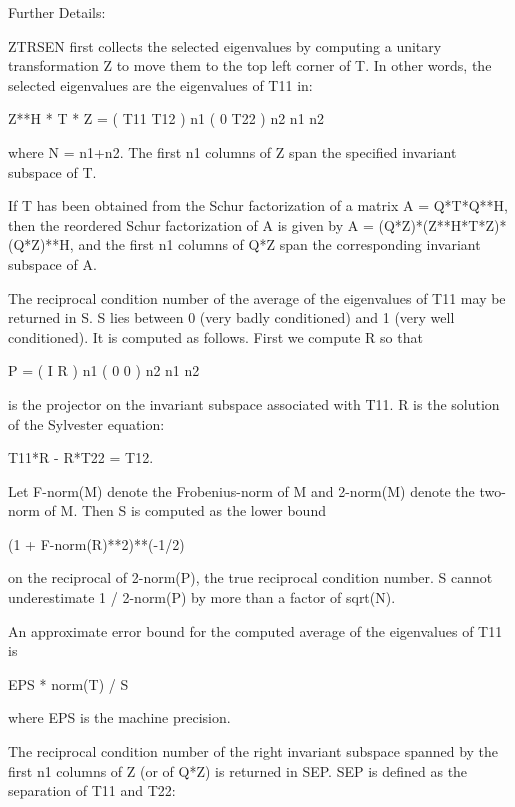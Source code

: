 \begin{DoxyParagraph}{Further Details\+: }
\begin{DoxyVerb}  ZTRSEN first collects the selected eigenvalues by computing a unitary
  transformation Z to move them to the top left corner of T. In other
  words, the selected eigenvalues are the eigenvalues of T11 in:

          Z**H * T * Z = ( T11 T12 ) n1
                         (  0  T22 ) n2
                            n1  n2

  where N = n1+n2. The first
  n1 columns of Z span the specified invariant subspace of T.

  If T has been obtained from the Schur factorization of a matrix
  A = Q*T*Q**H, then the reordered Schur factorization of A is given by
  A = (Q*Z)*(Z**H*T*Z)*(Q*Z)**H, and the first n1 columns of Q*Z span the
  corresponding invariant subspace of A.

  The reciprocal condition number of the average of the eigenvalues of
  T11 may be returned in S. S lies between 0 (very badly conditioned)
  and 1 (very well conditioned). It is computed as follows. First we
  compute R so that

                         P = ( I  R ) n1
                             ( 0  0 ) n2
                               n1 n2

  is the projector on the invariant subspace associated with T11.
  R is the solution of the Sylvester equation:

                        T11*R - R*T22 = T12.

  Let F-norm(M) denote the Frobenius-norm of M and 2-norm(M) denote
  the two-norm of M. Then S is computed as the lower bound

                      (1 + F-norm(R)**2)**(-1/2)

  on the reciprocal of 2-norm(P), the true reciprocal condition number.
  S cannot underestimate 1 / 2-norm(P) by more than a factor of
  sqrt(N).

  An approximate error bound for the computed average of the
  eigenvalues of T11 is

                         EPS * norm(T) / S

  where EPS is the machine precision.

  The reciprocal condition number of the right invariant subspace
  spanned by the first n1 columns of Z (or of Q*Z) is returned in SEP.
  SEP is defined as the separation of T11 and T22:


\end{DoxyVerb}
\end{DoxyParagraph}
